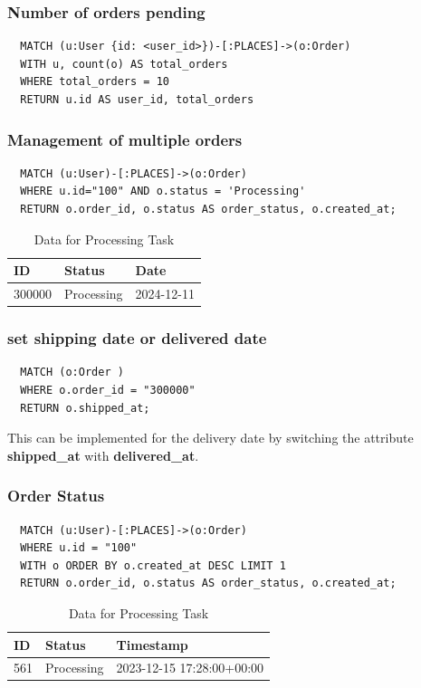 \documentclass[a4paper,12pt]{article}
\begin{document}
\subsubsection{Number of orders pending}
\begin{verbatim}
  MATCH (u:User {id: <user_id>})-[:PLACES]->(o:Order)
  WITH u, count(o) AS total_orders
  WHERE total_orders = 10
  RETURN u.id AS user_id, total_orders
\end{verbatim}

\subsubsection{Management of multiple orders}
\begin{verbatim}
  MATCH (u:User)-[:PLACES]->(o:Order)
  WHERE u.id="100" AND o.status = 'Processing'  
  RETURN o.order_id, o.status AS order_status, o.created_at;

\end{verbatim}
  \begin{table}[h!]
    \centering
    \caption{Data for Processing Task}
    \label{tab:processing_data}
    \begin{tabular}{l l l}
        \toprule
        \textbf{ID} & \textbf{Status} & \textbf{Date} \\
        \midrule
        300000 & Processing & 2024-12-11 \\
        \bottomrule
    \end{tabular}
\end{table}

\subsubsection{set shipping date or delivered date}
\begin{verbatim}
  MATCH (o:Order ) 
  WHERE o.order_id = "300000"
  RETURN o.shipped_at;
\end{verbatim}
This can be implemented for the delivery date by switching the attribute \textbf{shipped\_at} with \textbf{delivered\_at}.
\subsubsection{Order Status}
\begin{verbatim}
  MATCH (u:User)-[:PLACES]->(o:Order)
  WHERE u.id = "100"
  WITH o ORDER BY o.created_at DESC LIMIT 1
  RETURN o.order_id, o.status AS order_status, o.created_at;
\end{verbatim}
\begin{table}[h!]
  \centering
  \caption{Data for Processing Task}
  \label{tab:processing_data}
  \begin{tabular}{l l l}
      \toprule
      \textbf{ID} & \textbf{Status} & \textbf{Timestamp} \\
      \midrule
      561 & Processing & 2023-12-15 17:28:00+00:00 \\
      \bottomrule
  \end{tabular}
\end{table}
\end{document}
